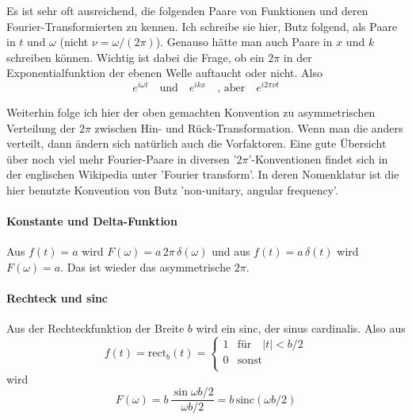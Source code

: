 Es ist sehr oft ausreichend, die folgenden Paare von Funktionen und deren Fourier-Transformierten zu kennen. Ich schreibe sie hier, Butz folgend, als Paare in $t$ und $\omega$ (nicht $\nu = \omega / (2 \pi)$). Genauso hätte man auch Paare in $x$ und $k$ schreiben können. Wichtig ist dabei die Frage, ob ein $2 \pi$ in der Exponentialfunktion der ebenen Welle auftaucht oder nicht. Also
\begin{equation}
e^{i \omega t} \quad \text{und} \quad e^{i k x} \quad \text{, aber} \quad 
e^{i 2 \pi \nu t}
\end{equation}

Weiterhin folge ich hier der oben gemachten Konvention zu asymmetrischen Verteilung der $2 \pi$ zwischen Hin- und Rück-Transformation. Wenn man die anders verteilt, dann ändern sich natürlich auch die Vorfaktoren. Eine gute Übersicht über noch viel mehr Fourier-Paare in diversen '$2 \pi$'-Konventionen findet sich in der englischen Wikipedia unter 'Fourier transform'. In deren Nomenklatur ist die hier benutzte Konvention von Butz 'non-unitary, angular frequency'.

\paragraph{Konstante und Delta-Funktion} Aus $f(t) = a$ wird $F(\omega) = a \, 2 \pi \, \delta(\omega)$ und aus  $f(t) = a \, \delta(t)$  wird $F(\omega) = a $. Das ist wieder das asymmetrische $2 \pi$.


\paragraph{Rechteck und sinc} Aus der Rechteckfunktion der Breite $b$ wird ein sinc, der sinus cardinalis. Also aus
\begin{equation}
 f(t) = \text{rect} _b (t) = \left\{ \begin{array}{ll}
 1 & \text{für} \quad |t| < b/2 \\
 0 & \text{sonst} \\
 \end{array}
 \right.
\end{equation}
wird 
\begin{equation}
F(\omega) = b \,  \frac{\sin \omega b / 2}{\omega b /2} = b \, \text{sinc}( \omega b /2)
\end{equation}



